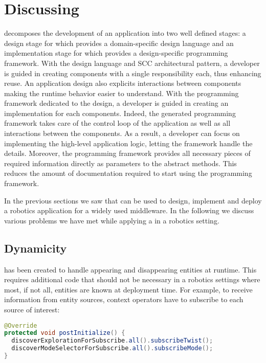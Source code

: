 
\section{Discussing}
\label{sec:discussing}

\diaspec{} decomposes the development of an application into two well
defined stages: a design stage for which \diaspec{} provides a
domain-specific design language and an implementation stage for which
\diaspec{} provides a design-specific programming framework. With the
design language and SCC architectural pattern, a developer is guided
in creating components with a single responsibility each, thus
enhancing reuse. An application design also explicits interactions
between components making the runtime behavior easier to understand.
With the programming framework dedicated to the design, a developer is
guided in creating an implementation for each components.
Indeed, the generated programming framework takes care of the control
loop of the application as well as all interactions between the
components. As a result, a developer can focus on implementing the
high-level application logic, letting the framework handle the
details. Moreover, the programming framework provides all necessary
pieces of required information directly as parameters to the abstract
methods. This reduces the amount of documentation required to start
using the programming framework.

In the previous sections we saw that \diaspec{} can be used to design,
implement and deploy a robotics application for a widely used
middleware. In the following we discuss various problems we have met
while applying a\diaspec{} in a robotics setting.

\subsection{\diaspec{} Dynamicity}

\diaspec{} has been created to handle appearing and disappearing
entities at runtime. This requires additional code that should not be
necessary in a robotics settings where most, if not all, entities are
known at deployment time. For example, to receive information from
entity sources, context operators have to subscribe to each source of
interest:

\begin{lstlisting}[language=java]
@Override
protected void postInitialize() {
  discoverExplorationForSubscribe.all().subscribeTwist();
  discoverModeSelectorForSubscribe.all().subscribeMode();
}
\end{lstlisting}

